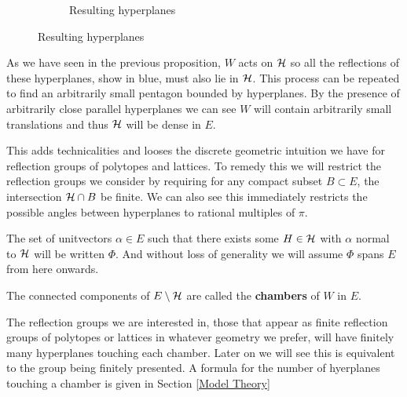 \documentclass[../main.tex]{subfiles}
\begin{document}
\begin{example}
\begin{figure}[H]
\begin{subfigure}{0.45\textwidth}
        \caption{Resulting hyperplanes}
      \end{subfigure}
    \end{figure}
    As we have seen in the previous proposition, $W$ acts on $\mathcal{H}$ so all the reflections of these hyperplanes, show in blue, must also lie in $\mathcal{H}$. This process can be repeated to find an arbitrarily small pentagon bounded by hyperplanes. By the presence of arbitrarily close parallel hyperplanes we can see $W$ will contain arbitrarily small translations and thus $\mathcal{H}$ will be dense in $E$.
\end{example}

This adds technicalities and looses the discrete geometric intuition we have for reflection groups of polytopes and lattices. To remedy this we will restrict the reflection groups we consider by requiring for any compact subset $B\subset E$, the intersection $\mathcal{H}\cap B$ be finite. We can also see this immediately restricts the possible angles between hyperplanes to rational multiples of $\pi$.

The set of unitvectors $\alpha \in E$ such that there exists some $H\in \mathcal{H}$ with $\alpha$ normal to $\mathcal{H}$ will be written $\Phi$. And without loss of generality we will assume $\Phi$ spans $E$ from here onwards.

\begin{definition}
    The connected components of $E\setminus \mathcal{H}$ are called the \textbf{chambers} of $W$ in $E$.
\end{definition}

The reflection groups we are interested in, those that appear as finite reflection groups of polytopes or lattices in whatever geometry we prefer, will have finitely many hyperplanes touching each chamber. Later on we will see this is equivalent to the group being finitely presented. A formula for the number of hyerplanes touching a chamber is given in Section \ref{Model Theory}
\end{document}
